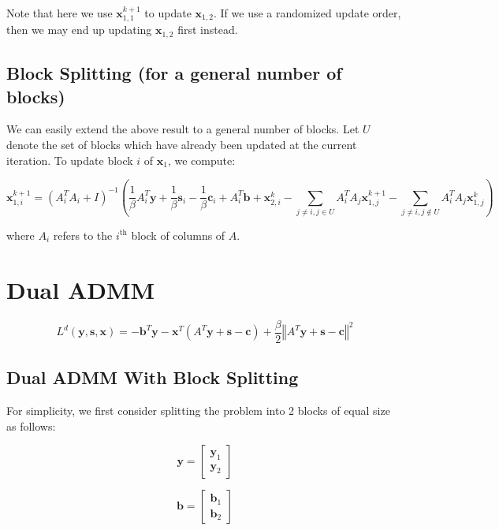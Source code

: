 \documentclass{article}
\begin{document}
Note that here we use $\mathbf{x}_{1,1}^{k+1}$ to update $\mathbf{x}_{1,2}$.
If we use a randomized update order, then we may end up updating $\mathbf{x}_{1,2}$
first instead.


\subsection*{Block Splitting (for a general number of blocks)}

We can easily extend the above result to a general number of blocks.
Let $U$ denote the set of blocks which have already been updated
at the current iteration. To update block $i$ of $\mathbf{x}_{1}$,
we compute:

\[
\mathbf{x}_{1,i}^{k+1}=\left(A_{i}^{T}A_{i}+I\right)^{-1}\left(\frac{1}{\beta}A_{i}^{T}\mathbf{y}+\frac{1}{\beta}\mathbf{s}_{i}-\frac{1}{\beta}\mathbf{c}_{i}+A_{i}^{T}\mathbf{b}+\mathbf{x}_{2,i}^{k}-\sum_{j\neq i,j\in U}A_{i}^{T}A_{j}\mathbf{x}_{1,j}^{k+1}-\sum_{j\neq i,j\notin U}A_{i}^{T}A_{j}\mathbf{x}_{1,j}^{k}\right)
\]


where $A_{i}$ refers to the $i^{\text{th}}$ block of columns of
$A$.


\section*{Dual ADMM }

\[
L^{d}(\mathbf{y},\mathbf{s},\mathbf{x})=-\mathbf{b}^{T}\mathbf{y}-\mathbf{x}^{T}\left(A^{T}\mathbf{y}+\mathbf{s}-\mathbf{c}\right)+\frac{\beta}{2}\left\Vert A^{T}\mathbf{y}+\mathbf{s}-\mathbf{c}\right\Vert ^{2}
\]



\subsection*{Dual ADMM With Block Splitting}

For simplicity, we first consider splitting the problem into 2 blocks
of equal size as follows:

\[
\mathbf{y}=\begin{bmatrix}\mathbf{y}_{1}\\
\mathbf{y}_{2}
\end{bmatrix}
\]


\[
\mathbf{b}=\begin{bmatrix}\mathbf{b}_{1}\\
\mathbf{b}_{2}
\end{bmatrix}
\]
\end{document}
